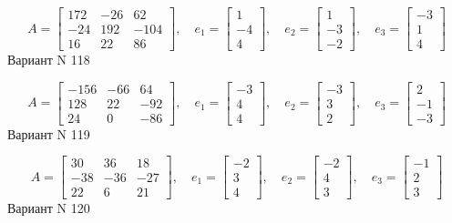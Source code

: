 \documentclass[11pt]{report}
\begin{document}
$$A = \left[\begin{matrix}172 & -26 & 62\\-24 & 192 & -104\\16 & 22 & 86\end{matrix}\right],\quad e_1 = \left[\begin{matrix}1\\-4\\4\end{matrix}\right],\quad e_2 = \left[\begin{matrix}1\\-3\\-2\end{matrix}\right],\quad e_3 = \left[\begin{matrix}-3\\1\\4\end{matrix}\right]$$Вариант N 118

$$A = \left[\begin{matrix}-156 & -66 & 64\\128 & 22 & -92\\24 & 0 & -86\end{matrix}\right],\quad e_1 = \left[\begin{matrix}-3\\4\\4\end{matrix}\right],\quad e_2 = \left[\begin{matrix}-3\\3\\2\end{matrix}\right],\quad e_3 = \left[\begin{matrix}2\\-1\\-3\end{matrix}\right]$$Вариант N 119

$$A = \left[\begin{matrix}30 & 36 & 18\\-38 & -36 & -27\\22 & 6 & 21\end{matrix}\right],\quad e_1 = \left[\begin{matrix}-2\\3\\4\end{matrix}\right],\quad e_2 = \left[\begin{matrix}-2\\4\\3\end{matrix}\right],\quad e_3 = \left[\begin{matrix}-1\\2\\3\end{matrix}\right]$$Вариант N 120
\end{document}
